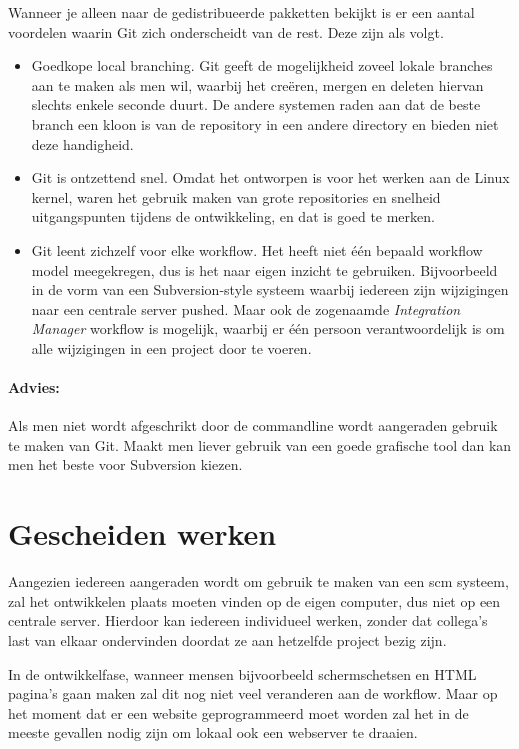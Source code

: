 Wanneer je alleen naar de gedistribueerde pakketten bekijkt is er een aantal voordelen waarin Git zich onderscheidt van de rest. Deze zijn als volgt.

\begin{itemize}
  \item Goedkope local branching. Git geeft de mogelijkheid zoveel lokale branches aan te maken als men wil, waarbij het creëren, mergen en deleten hiervan slechts enkele seconde duurt. De andere systemen raden aan dat de beste branch een kloon is van de repository in een andere directory en bieden niet deze handigheid.
  \item Git is ontzettend snel\cite{whygitisbetterthanx}. Omdat het ontworpen is voor het werken aan de Linux kernel, waren het gebruik maken van grote repositories en snelheid uitgangspunten tijdens de ontwikkeling, en dat is goed te merken.
  \item Git leent zichzelf voor elke workflow. Het heeft niet één bepaald workflow model meegekregen, dus is het naar eigen inzicht te gebruiken. Bijvoorbeeld in de vorm van een Subversion-style systeem waarbij iedereen zijn wijzigingen naar een centrale server pushed. Maar ook de zogenaamde \emph{Integration Manager} workflow is mogelijk, waarbij er één persoon verantwoordelijk is om alle wijzigingen in een project door te voeren.
\end{itemize}

\paragraph{Advies:} Als men niet wordt afgeschrikt door de commandline wordt aangeraden gebruik te maken van Git. Maakt men liever gebruik van een goede grafische tool dan kan men het beste voor Subversion kiezen.

\section{Gescheiden werken}

Aangezien iedereen aangeraden wordt om gebruik te maken van een {\sc scm} systeem, zal het ontwikkelen plaats moeten vinden op de eigen computer, dus niet op een centrale server. Hierdoor kan iedereen individueel werken, zonder dat collega's last van elkaar ondervinden doordat ze aan hetzelfde project bezig zijn.

In de ontwikkelfase, wanneer mensen bijvoorbeeld schermschetsen en HTML pagina's gaan maken zal dit nog niet veel veranderen aan de workflow. Maar op het moment dat er een website geprogrammeerd moet worden zal het in de meeste gevallen nodig zijn om lokaal ook een webserver te draaien. 

